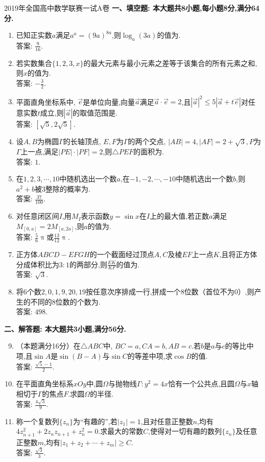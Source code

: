 \documentclass[UTF8,no-math,12pt,openany,table,dvipsnames,svgnames]{book}
\renewcommand{\pi}{\uppi}
\renewcommand{\le}{\leqslant}
\renewcommand{\ge}{\geqslant}
\newcommand{\kong}{\underline{\hspace{4em}}}
\newcommand\OR{\overrightarrow}
\begin{document}
\begin{MYBOX}[colbacktitle=blue]{2019年全国高中数学联赛一试A卷}
\textbf{一、填空题: 本大题共8小题,每小题8分,满分64分.}
\begin{enumerate}
\item 已知正实数$a$满足$a^a=(9a)^{8a}$,则$\log_a(3a)$的值为\kong.\\
答案: $\frac9{16}$.
\item 若实数集合$\{1,2,3,x\}$的最大元素与最小元素之差等于该集合的所有元素之和,则$x$的值为\kong.\\
答案: $-\frac32$.
\item 平面直角坐标系中, $\OR{e}$是单位向量,向量$\OR{a}$满足$\OR{a}\cdot\OR{e}=2$,且$|\OR{a}|^2\le5|\OR{a}+t\OR{e}|$对任意实数$t$成立,则$|\OR{a}|$的取值范围是\kong.\\
答案: $\left[\sqrt5,2\sqrt5\right]$.
\item 设$A,B$为椭圆$\Gamma$的长轴顶点, $E,F$为$\Gamma$的两个交点, $|AB|=4,|AF|=2+\sqrt3,P$为$\Gamma$上一点,满足$|PE|\cdot|PF|=2$,则$\triangle PEF$的面积为\kong.\\
答案: $1$.
\item 在$1,2,3,\cdots,10$中随机选出一个数$a$,在$-1,-2,\cdots,-10$中随机选出一个数$b$,则$a^2+b$被$3$整除的概率为\kong.\\
答案: $\frac{37}{100}$.
\item 对任意闭区间$I$,用$M_I$表示函数$y=\sin x$在$I$上的最大值,若正数$a$满足$M_{[0,a]}=2M_{[a,2a]}$,则$a$的值为\kong.\\
答案: $\frac56\pi$或$\frac{13}{12}\pi$.
\item 正方体$ABCD-EFGH$的一个截面经过顶点$A,C$及棱$EF$上一点$K$,且将正方体分成体积比为$3:1$的两部分,则$\frac{EK}{KF}$的值为\kong.\\
答案: $\sqrt3$.
\item 将$6$个数$2,0,1,9,20,19$按任意次序排成一行,拼成一个$8$位数（首位不为$0$）,则产生的不同的$8$位数的个数为\kong.\\
答案: $498$.
\end{enumerate}
\textbf{二、解答题: 本大题共3小题,满分56分.}
\begin{enumerate}
\setcounter{enumi}{8}
\item （{\kaishu 本题满分16分}）在$\triangle ABC$中, $BC=a,CA=b,AB=c$.若$b$是$a$与$c$的等比中项,且$\sin A$是$\sin(B-A)$与$\sin C$的等差中项,求$\cos B$的值.\\
答案: $\frac{\sqrt5-1}2$.
\item 在平面直角坐标系$xOy$中,圆$\Omega$与抛物线$\Gamma :y^2=4x$恰有一个公共点,且圆$\Omega$与$x$轴相切于$\Gamma$的焦点$F$.求圆$\Omega$的半径.\\
答案: $\frac{4\sqrt3}9$.
\item 称一个复数列$\{z_n\}$为``有趣的'',若$|z_1|=1$,且对任意正整数$n$,均有$4z_{n+1}^2+2z_nz_{n+1}+z_n^2=0$.求最大的常数$C$,使得对一切有趣的数列$\{z_n\}$及任意正整数$m$,均有$|z_1+z_2+\cdots+z_m|\ge C$.\\
答案: $\frac{\sqrt3}3$.
\end{enumerate}
\end{MYBOX}
\end{document}

